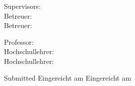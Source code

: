\begin{titlepage}
\begin{center}
	\vspace{1.5cm}
\end{center}

	\noindent
	\ifx\doclanguage\english
		Supervisors: \\
	\fi
	\ifx\doclanguage\german
		Betreuer: \\
	\fi
	\ifx\doclanguage\ngerman
		Betreuer: \\
	\fi
	\supervisors
	
	\vspace{.5cm}
	
	\noindent
	\ifx\doclanguage\english
		Professor: \\
	\fi
	\ifx\doclanguage\german
		Hochschullehrer: \\
	\fi
	\ifx\doclanguage\ngerman
		Hochschullehrer: \\
	\fi
	\professor
	
	\vspace{1.5cm}
	
	\noindent
	\ifx\doclanguage\english
		Submitted
	\fi
	\ifx\doclanguage\german
		Eingereicht am
	\fi
	\ifx\doclanguage\ngerman
		Eingereicht am
	\fi
	\docdate



\end{titlepage}

\restoregeometry
